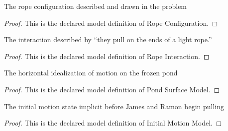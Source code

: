 \begin{definition}
  \label{def:physics:phyx-mini-0817:phyxminiproblems-problemphyxmini0817-ropeconfiguration}
  The rope configuration described and drawn in the problem
\end{definition}
\begin{proof}
  This is the declared model definition of Rope Configuration.
\end{proof}
\begin{definition}
  \label{def:physics:phyx-mini-0817:phyxminiproblems-problemphyxmini0817-ropeinteraction}
  The interaction described by “they pull on the ends of a light rope.”
\end{definition}
\begin{proof}
  This is the declared model definition of Rope Interaction.
\end{proof}
\begin{definition}
  \label{def:physics:phyx-mini-0817:phyxminiproblems-problemphyxmini0817-pondsurfacemodel}
  The horizontal idealization of motion on the frozen pond
\end{definition}
\begin{proof}
  This is the declared model definition of Pond Surface Model.
\end{proof}
\begin{definition}
  \label{def:physics:phyx-mini-0817:phyxminiproblems-problemphyxmini0817-initialmotionmodel}
  The initial motion state implicit before James and Ramon begin pulling
\end{definition}
\begin{proof}
  This is the declared model definition of Initial Motion Model.
\end{proof}
